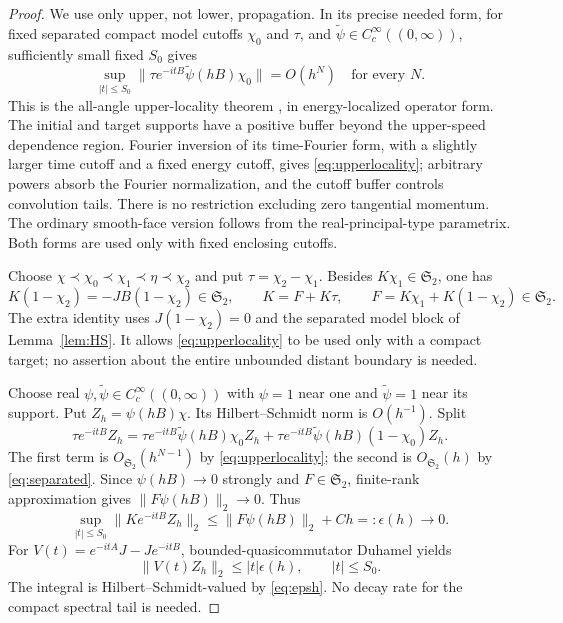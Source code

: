 \documentclass[11pt]{amsart}
\numberwithin{equation}{section}
\theoremstyle{remark}
\newcommand{\Stwo}{\mathfrak{S}_2}
\begin{document}
\begin{proof}
We use only upper, not lower, propagation. In its precise needed form, for fixed separated compact model cutoffs $\chi_0$ and $\tau$, and $\widetilde\psi\in C_c^\infty((0,\infty))$, sufficiently small fixed $S_0$ gives
\begin{equation}\label{eq:upperlocality}
\sup_{|t|\le S_0}\|\tau e^{-itB}\widetilde\psi(hB)\chi_0\|=O(h^N)\quad\text{for every }N .
\end{equation}
This is the all-angle upper-locality theorem \cite[Propositions~3.1 and~3.5]{I}, in energy-localized operator form. The initial and target supports have a positive buffer beyond the upper-speed dependence region. Fourier inversion of its time-Fourier form, with a slightly larger time cutoff and a fixed energy cutoff, gives \eqref{eq:upperlocality}; arbitrary powers absorb the Fourier normalization, and the cutoff buffer controls convolution tails. There is no restriction excluding zero tangential momentum. The ordinary smooth-face version follows from the real-principal-type parametrix. Both forms are used only with fixed enclosing cutoffs.

Choose $\chi\prec\chi_0\prec\chi_1\prec\eta\prec\chi_2$ and put $\tau=\chi_2-\chi_1$. Besides $K\chi_1\in\Stwo$, one has
\begin{equation}\label{eq:Ksplit}
K(1-\chi_2)=-JB(1-\chi_2)\in\Stwo,\qquad K=F+K\tau,\qquad F=K\chi_1+K(1-\chi_2)\in\Stwo .
\end{equation}
The extra identity uses $J(1-\chi_2)=0$ and the separated model block of Lemma~\ref{lem:HS}. It allows \eqref{eq:upperlocality} to be used only with a compact target; no assertion about the entire unbounded distant boundary is needed.

Choose real $\psi,\widetilde\psi\in C_c^\infty((0,\infty))$ with $\psi=1$ near one and $\widetilde\psi=1$ near its support. Put $Z_h=\psi(hB)\chi$. Its Hilbert--Schmidt norm is $O(h^{-1})$. Split
\begin{equation}\label{eq:Zsplit}
\tau e^{-itB}Z_h=\tau e^{-itB}\widetilde\psi(hB)\chi_0Z_h+\tau e^{-itB}\widetilde\psi(hB)(1-\chi_0)Z_h .
\end{equation}
The first term is $O_{\Stwo}(h^{N-1})$ by \eqref{eq:upperlocality}; the second is $O_{\Stwo}(h)$ by \eqref{eq:separated}. Since $\psi(hB)\to0$ strongly and $F\in\Stwo$, finite-rank approximation gives $\|F\psi(hB)\|_2\to0$. Thus
\begin{equation}\label{eq:epsh}
\sup_{|t|\le S_0}\|Ke^{-itB}Z_h\|_2\le\|F\psi(hB)\|_2+Ch=:\epsilon(h)\longrightarrow0 .
\end{equation}
For $V(t)=e^{-itA}J-Je^{-itB}$, bounded-quasicommutator Duhamel yields
\begin{equation}\label{eq:Vt}
\|V(t)Z_h\|_2\le|t|\epsilon(h),\qquad |t|\le S_0 .
\end{equation}
The integral is Hilbert--Schmidt-valued by \eqref{eq:epsh}. No decay rate for the compact spectral tail is needed.


\end{proof}
\end{document}
